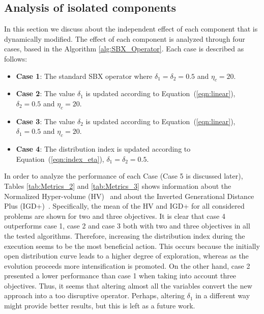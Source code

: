 \subsection{Analysis of isolated components}

In this section we discuss about the independent effect of each component that is dynamically modified.
%
%
%
%
The effect of each component is analyzed through four cases, based in the Algorithm \ref{alg:SBX_Operator}.
%
Each case is described as follows:

\begin{itemize}
\item \textbf{Case 1}: The standard SBX operator where $\delta_1 = \delta_2 = 0.5$ and $\eta_c = 20$.
\item \textbf{Case 2}: The value $\delta_1$ is updated according to Equation~(\ref{eqn:linear}),  $\delta_2=0.5$ and $\eta_c = 20$.
\item \textbf{Case 3}: The value $\delta_2$ is updated according to Equation~(\ref{eqn:linear}), $\delta_1=0.5$ and $\eta_c = 20$.
\item \textbf{Case 4}: The distribution index is updated according to Equation~(\ref{eqn:index_eta}), $\delta_1=\delta_2=0.5$.
\end{itemize}


In order to analyze the performance of each Case (Case 5 is discussed later), Tables \ref{tab:Metrics_2} and
\ref{tab:Metrics_3} shows information about the Normalized Hyper-volume 
(HV)~\cite{zitzler1999multiobjective} and about the Inverted Generational Distance Plus (IGD+)~\cite{Joel:IGDPlus_And_GDPlus}.
%
Specifically, the mean of the HV and IGD+ for all considered problems are shown for two and three objectives.
%
It is clear that case 4 outperforms case 1, case 2 and case 3 both with two and three objectives in all the tested algorithms.
%
Therefore, increasing the distribution index during the execution seems to be the most beneficial action.
%
This occurs because the initially open distribution curve leads to a higher degree of exploration, whereas as the evolution
proceeds more intensification is promoted.
%
On the other hand, case 2 presented a lower performance than case 1 when taking into account three objectives.
%
Thus, it seems that altering almost all the variables convert the new approach into a too disruptive operator.
%
Perhaps, altering $\delta_1$ in a different way might provide better results, but this is left as a future work.

